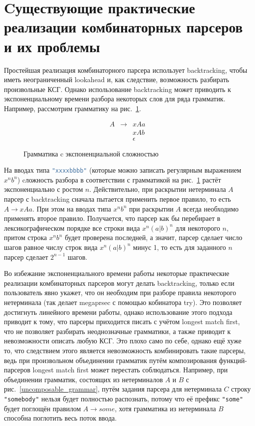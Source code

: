 \documentclass[times]{itmo-student-thesis}
\begin{document}
\section{Cуществующие практические реализации комбинаторных парсеров и их проблемы}\label{sec:current_parser_combinators_problems}

Простейшая реализация комбинаторного парсера использует backtracking, чтобы иметь неограниченный lookahead и, как
следствие, возможность разбирать произвольные КСГ. Однако использование backtracking может приводить к
экспоненциальному времени разбора некоторых слов для ряда грамматик. Например, рассмотрим грамматику на
рис.~\ref{exp_grammar}.

\begin{figure}[!h]
\caption{Грамматика c экспоненциальной сложностью}\label{exp_grammar}
\[
    \begin{array}{lll}
        A & \to & xAa      \\
          &     & xAb      \\
          &     & \epsilon
    \end{array}
\]
\end{figure}

На вводах типа \lstinline[language=Haskell]{"xxxxbbbb"} (которые можно записать регулярным выражением $x^nb^n$) cложность разбора
в соответствии с грамматикой на рис.~\ref{exp_grammar} растёт экспоненциально с ростом $n$.
Действительно, при раскрытии нетерминала $A$ парсер с backtracking сначала пытается применить первое
правило, то есть $A \to xAa$. При этом на вводах типа $x^nb^n$ при раскрытии
$A$ всегда необходимо применять второе правило. Получается, что парсер как бы перебирает в
лексикографическом порядке все строки вида $x^n(a|b)^n$ для некоторого $n$, притом строка
$x^nb^n$ будет проверена последней, а значит, парсер сделает число шагов равное числу строк вида
$x^n(a|b)^n$ минус 1, то есть для заданного $n$ парсер сделает $2^{n-1}$ шагов.

Во избежание экспоненциального времени работы некоторые практические реализации комбинаторных парсеров могут делать
backtracking, только если пользователь явно укажет, что он необходим при разборе правила некоторого нетерминала (так
делает megaprsec\cite{megaparsec} с помощью кобинатора try). Это позволяет достигнуть линейного времени работы,
однако использование этого подхода приводит к тому, что парсеры приходится писать с учётом longest match first, что не
позволяет разбирать неоднозначные грамматики, а также приводит к невозможности описать любую КСГ. Это плохо само по
себе, однако ещё хуже то, что следствием этого является невозможность комбинировать такие парсеры, ведь при
произвольном объединении грамматик путём композирования функций-парсеров longest match first может перестать
соблюдаться. Например, при объединении грамматик, состоящих из нетерминалов $A$ и
$B$ с рис.~\ref{uncomposable_grammar}, путём задания парсера для нетерминала $C$ строку
\lstinline|"somebody"| нельзя будет полностью распознать, потому что её префикс \lstinline|"some"| будет поглощён правилом
$A \to some$, хотя грамматика из нетерминала $B$ способна поглотить весь поток ввода.
\end{document}
